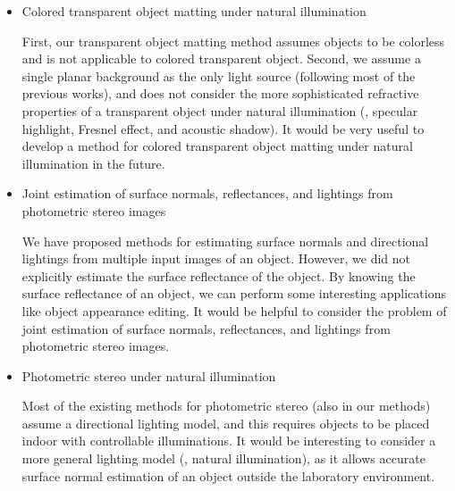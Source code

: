 \begin{itemize}
\item Colored transparent object matting under natural illumination

    First, our transparent object matting method assumes objects to be colorless and is not applicable to colored transparent object. Second, we assume a single planar background as the only light source (following most of the previous works), and does not consider the more sophisticated refractive properties of a transparent object under natural illumination (\eg, specular highlight, Fresnel effect, and acoustic shadow).  
It would be very useful to develop a method for colored transparent object matting under natural illumination in the future.

\item Joint estimation of surface normals, reflectances, and lightings from photometric stereo images

    We have proposed methods for estimating surface normals and directional lightings from multiple input images of an object. However, we did not explicitly estimate the surface reflectance of the object. By knowing the surface reflectance of an object, we can perform some interesting applications like object appearance editing. It would be helpful to consider the problem of joint estimation of surface normals, reflectances, and lightings from photometric stereo images.

\item Photometric stereo under natural illumination

    Most of the existing methods for photometric stereo (also in our methods) assume a directional lighting model, and this requires objects to be placed indoor with controllable illuminations. It would be interesting to consider a more general lighting model (\eg, natural illumination), as it allows accurate surface normal estimation of an object outside the laboratory environment.
\end{itemize}
